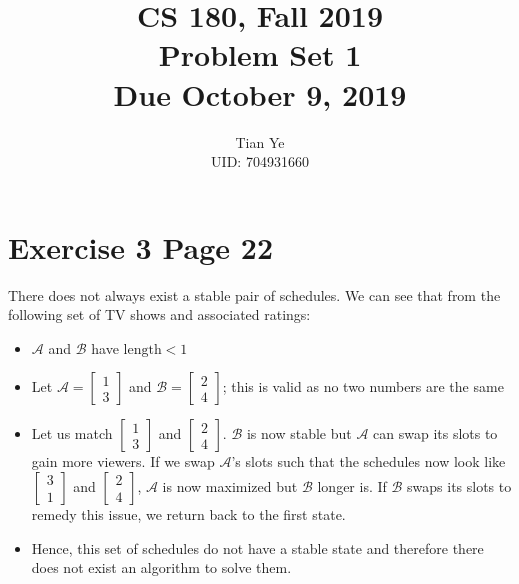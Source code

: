 \documentclass[11pt]{article}
\newcommand{\cnum}{CS 180}
\newcommand{\ced}{Fall 2019}
\newcommand{\ctitle}[3]{\title{\vspace{-0.5in}\cnum, \ced\\Problem Set #1 #2\\Due #3}}
\begin{document}
\ctitle{1}{}{October 9, 2019}
\author{Tian Ye \\ \small{UID: 704931660}}
\maketitle

\newpage

\section*{Exercise 3 Page 22}
There does not always exist a stable pair of schedules. We can see that from the following set of TV shows and associated ratings: \\
\begin{itemize}
\item $\mathscr{A}$ and $\mathscr{B}$ have $\text{length} < 1$
\item Let $\mathscr{A} = \begin{bmatrix} 1 \\ 3 \end{bmatrix}$ and $\mathscr{B} = \begin{bmatrix} 2 \\ 4 \end{bmatrix}$; this is valid as no two numbers are the same
\item Let us match $\begin{bmatrix} 1 \\ 3 \end{bmatrix}$ and $\begin{bmatrix} 2 \\ 4 \end{bmatrix}$. $\mathscr{B}$ is now stable but $\mathscr{A}$ can swap its slots to gain more viewers. If we swap $\mathscr{A}$'s slots such that the schedules now look like $\begin{bmatrix} 3 \\ 1 \end{bmatrix}$ and $\begin{bmatrix} 2 \\ 4 \end{bmatrix}$,  $\mathscr{A}$ is now maximized but  $\mathscr{B}$ longer is. If  $\mathscr{B}$ swaps its slots to remedy this issue, we return back to the first state.
\item Hence, this set of schedules do not have a stable state and therefore there does not exist an algorithm to solve them.
\end{itemize}
\newpage
\end{document}
